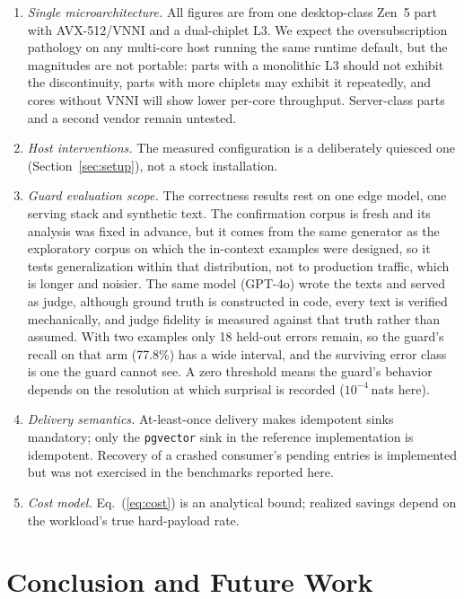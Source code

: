 \documentclass[conference]{IEEEtran}
\begin{document}
\begin{enumerate}
\item \emph{Single microarchitecture.} All figures are from one desktop-class Zen~5 part with AVX-512/VNNI and a dual-chiplet L3. We expect the oversubscription pathology on any multi-core host running the same runtime default, but the magnitudes are not portable: parts with a monolithic L3 should not exhibit the discontinuity, parts with more chiplets may exhibit it repeatedly, and cores without VNNI will show lower per-core throughput. Server-class parts and a second vendor remain untested.
\item \emph{Host interventions.} The measured configuration is a deliberately quiesced one (Section~\ref{sec:setup}), not a stock installation.
\item \emph{Guard evaluation scope.} The correctness results rest on one edge model, one serving stack and synthetic text. The confirmation corpus is fresh and its analysis was fixed in advance, but it comes from the same generator as the exploratory corpus on which the in-context examples were designed, so it tests generalization within that distribution, not to production traffic, which is longer and noisier. The same model (GPT-4o) wrote the texts and served as judge, although ground truth is constructed in code, every text is verified mechanically, and judge fidelity is measured against that truth rather than assumed. With two examples only 18 held-out errors remain, so the guard's recall on that arm (77.8\%) has a wide interval, and the surviving error class is one the guard cannot see. A zero threshold means the guard's behavior depends on the resolution at which surprisal is recorded ($10^{-4}$\,nats here).
\item \emph{Delivery semantics.} At-least-once delivery makes idempotent sinks mandatory; only the \texttt{pgvector} sink in the reference implementation is idempotent. Recovery of a crashed consumer's pending entries is implemented but was not exercised in the benchmarks reported here.
\item \emph{Cost model.} Eq.~(\ref{eq:cost}) is an analytical bound; realized savings depend on the workload's true hard-payload rate.
\end{enumerate}

\section{Conclusion and Future Work}
\end{document}
